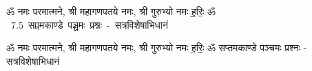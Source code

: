 \documentclass[17pt]{extarticle}
\begin{document}
\begin{titlepage}
    \begin{center}
 
\begin{sanskrit}
    { \Large
    ॐ नमः परमात्मने, श्री महागणपतये नमः, श्री गुरुभ्यो नमः
ह॒रिः॒ ॐ 
    }
    \\
    \vspace{2.5cm}
    \mbox{ \Huge
    7.5      सप्तमकाण्डे पञ्चमः प्रश्नः - सत्रविशेषाभिधानं   }
\end{sanskrit}
\end{center}

\end{titlepage}
\tableofcontents

ॐ नमः परमात्मने, श्री महागणपतये नमः, श्री गुरुभ्यो नमः
ह॒रिः॒ ॐ       सप्तमकाण्डे पञ्चमः प्रश्नः - सत्रविशेषाभिधानं \newline

\end{document}
